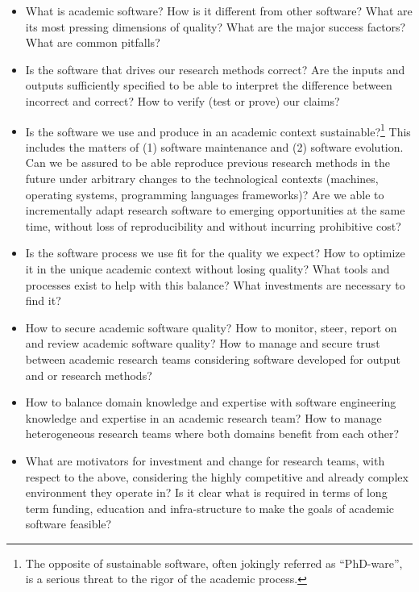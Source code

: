 \documentclass[a4paper,UKenglish]{dagman}
\begin{document}
\begin{itemize}
\item What is academic software? How is it different from other software? What are its most pressing dimensions of quality? What are the major success factors? What are common pitfalls?
\item Is the software that drives our research methods correct? Are the inputs and outputs sufficiently specified to be able to interpret the difference between incorrect and correct? How to verify (test or prove) our claims?
\item Is the software we use and produce in an academic context sustainable?\footnote{The opposite of sustainable software, often jokingly referred as ``PhD-ware'', is a serious threat to the rigor of the academic process.} This includes the matters of (1) software maintenance and (2) software evolution. Can we be assured to be able reproduce previous research methods in the future under arbitrary changes to the technological contexts (machines, operating systems, programming languages frameworks)? Are we able to incrementally adapt research software to emerging opportunities at the same time, without loss of reproducibility and without incurring prohibitive cost?
\item Is the software process we use fit for the quality we expect? How to optimize it in the unique academic context without losing quality? What tools and processes exist to help with this balance? What investments are necessary to find it?
\item How to secure academic software quality? How to monitor, steer, report on and review academic software quality? How to manage and secure trust between academic research teams considering software developed for output and or research methods?
\item How to balance domain knowledge and expertise with software engineering knowledge and expertise in an academic research team? How to manage heterogeneous research teams where both domains benefit from each other?   
\item What are motivators for investment and change for research teams, with respect to the above, considering the highly competitive and already complex environment they operate in? Is it clear what is required in terms of long term funding, education and infra-structure to make the goals of academic software feasible?
\end{itemize}

\end{document}
